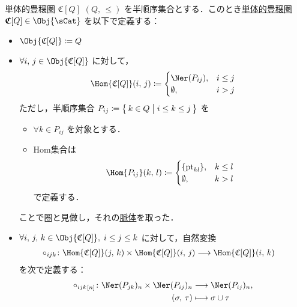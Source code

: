 \documentclass[TQFT_main]{subfiles}
\begin{document}
\begin{mydef}[label=def:PathCat,breakable]{単体的豊穣圏 {$\mathfrak{C}[Q]$}}
$(Q,\, \le)$ を半順序集合とする．このとき\hyperref[def:SimpCat]{単体的豊穣圏} $\bm{\mathfrak{C}}[Q] \in \Obj{\sCat}$ を以下で定義する：
\begin{itemize}
    \item $\Obj{\mathfrak{C}[Q]} \coloneqq Q$
    \item $\forall i,\, j \in \Obj{\mathfrak{C}[Q]}$ に対して，
    \begin{align}
        \Hom{\mathfrak{C}[Q]} (i,\, j) \coloneqq 
        \begin{cases}
            \Ner (P_{ij}), &i \le j \\
            \emptyset, &i > j
        \end{cases}
    \end{align}
    ただし，半順序集合 $P_{ij} \coloneqq \bigl\{\, k \in Q \bigm| i \le k \le j \,\bigr\}$ を
    \begin{itemize}
        \item $\forall k \in P_{ij}$ を対象とする．
        \item Hom集合は
        \begin{align}
            \Hom{P_{ij}} (k,\, l) \coloneqq 
            \begin{cases}
                \{\mathrm{pt}_{kl}\}, &k \le l \\
                \emptyset, &k > l
            \end{cases}
        \end{align}
        で定義する．
    \end{itemize}
    ことで圏と見做し，それの\hyperref[def:nerve]{脈体}を取った．
    \item $\forall i,\, j,\, k \in \Obj{\mathfrak{C}[Q]},\; i \le j \le k$ に対して，自然変換
    \begin{align}
        \circ_{ijk} \colon \Hom{\mathfrak{C}[Q]}(j,\, k) \times \Hom{\mathfrak{C}[Q]}(i,\, j) &\lto \Hom{\mathfrak{C}[Q]}(i,\, k)
    \end{align}
    を次で定義する：
    \begin{align}
        \circ_{ijk}{}_{[n]} \colon \Ner (P_{jk})_n \times \Ner (P_{ij})_n &\lto \Ner (P_{ij})_n, \\
        (\sigma,\, \tau) &\lmto \sigma \cup \tau
    \end{align}
\end{itemize}    
\end{mydef}
\end{document}
